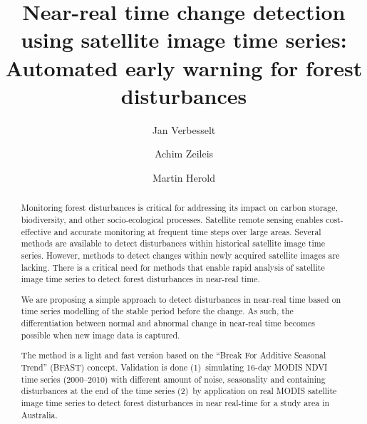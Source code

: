 \documentclass[authoryear,preprint,review,10pt]{elsarticle}
\begin{document}
\begin{frontmatter}

    \title
    {
    Near-real time change detection using satellite image time series:
    Automated early warning for forest disturbances
    }
    
    \author[WUR]{Jan Verbesselt}
    \author[UIBK]{Achim Zeileis}
    \author[WUR]{Martin Herold}


    \address[WUR]{Remote Sensing Team, Wageningen University, \\
           Droevendaalsesteeg 3, Wageningen 6708 PB, The Netherlands}
    \address[UIBK]{Department of Statistics, Universit\"at Innsbruck \\
           Universit\"atsstr.~15, A-6020 Innsbruck, Austria}

\singlespace

\begin{abstract}

Monitoring forest disturbances is critical for addressing its impact on carbon
storage, biodiversity, and other socio-ecological processes. Satellite remote
sensing enables cost-effective and accurate monitoring at frequent time steps
over large areas.  Several methods are available to detect disturbances within
historical satellite image time series. However, methods to detect changes
within newly acquired satellite images are lacking. There is a critical need for
methods that enable rapid analysis of satellite image time series to detect
forest disturbances in near-real time.

We are proposing a simple approach to detect disturbances in near-real time
based on time series modelling of the stable period before the change. As such,
the differentiation between normal and abnormal change in near-real time becomes
possible when new image data is captured. 

The method is a light and fast version based on the ``Break For Additive Seasonal
Trend'' (BFAST) concept. Validation is done (1)~simulating 16-day MODIS NDVI time
series (2000--2010) with different amount of noise, seasonality and containing
disturbances at the end of the time series (2)~by application on real MODIS
satellite image time series to detect forest disturbances in near real-time for
a study area in Australia. 


\end{abstract}
\end{frontmatter}
\end{document}
